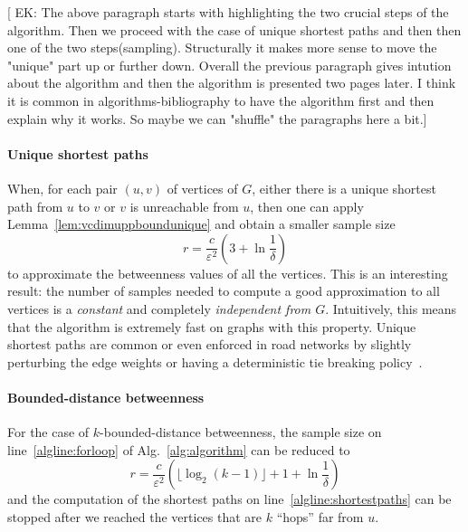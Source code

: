 [ EK: The above paragraph starts with highlighting the two crucial steps of the algorithm. Then we proceed with 
the case of unique shortest paths and then then one of the two steps(sampling). Structurally it makes more sense to 
move the "unique" part up or further down. Overall the previous paragraph gives intution about the algorithm and then
the algorithm is presented two pages later. I think it is common in algorithms-bibliography to have the algorithm first and 
then explain why it works. So maybe we can "shuffle" the paragraphs here a bit.]

\paragraph{Unique shortest paths} 
When, for each pair $(u,v)$ of vertices of $G$, either there is a unique
shortest path from $u$ to $v$ or $v$ is unreachable from $u$, 
 then one can apply Lemma~\ref{lem:vcdimuppboundunique} and obtain a smaller
sample size
\[
  r= \frac{c}{\varepsilon^2}\left(3+\ln\frac{1}{\delta}\right)
\]
to approximate the betweenness values of all the vertices. 
This is an interesting result: the number of samples needed to compute a good
approximation to all vertices is a \emph{constant} and completely
\emph{independent from $G$}. Intuitively, this means that the algorithm is
extremely fast on graphs with this property. Unique shortest paths are common or
even enforced in road networks by slightly perturbing the edge weights or having
a deterministic tie breaking policy~\citep{GeisbergerSS08}.

\ifproof
\else
\paragraph{Bounded-distance betweenness} For the case of
$k$-bounded-distance betweenness, the sample size on line~\ref{algline:forloop}
of Alg.~\ref{alg:algorithm} can be reduced to 
\[ 
  r= \frac{c}{\varepsilon^2}\left(\lfloor\log_2(k-1)\rfloor + 1 +\ln\frac{1}{\delta}\right)
\]
and the computation of the shortest paths on line~\ref{algline:shortestpaths}
can be stopped after we reached the vertices that are $k$ ``hops'' far from $u$.
\fi

